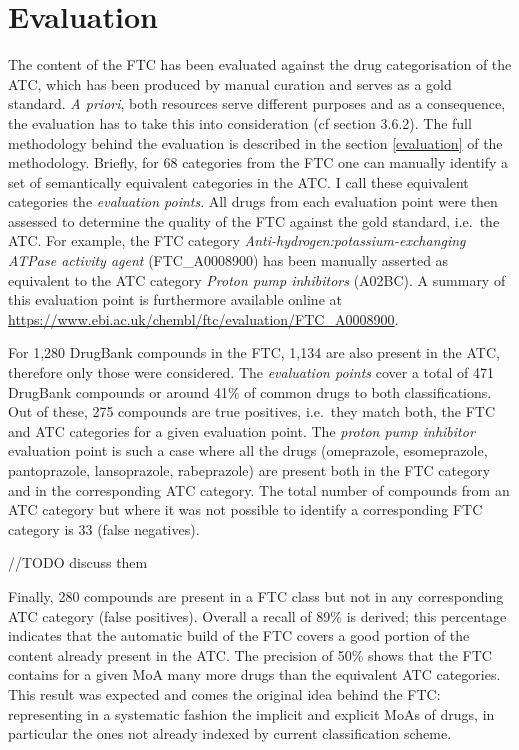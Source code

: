 \section{Evaluation}
The content of the FTC has been evaluated against the drug categorisation of the ATC, which has been produced by manual curation and serves as a gold standard. \emph{A priori}, both resources serve different purposes and as a consequence, the evaluation has to take this into consideration (cf section 3.6.2). The full methodology behind the evaluation is described in the section \ref{evaluation} of the methodology. Briefly, for 68 categories from the FTC one can manually identify a set of semantically equivalent categories in the ATC. I call these equivalent categories the \emph{evaluation points}. All drugs from each evaluation point were then assessed to determine the quality of the FTC against the gold standard, i.e.\ the ATC. For example, the FTC category \emph{Anti-hydrogen:potassium-exchanging ATPase activity agent} (FTC\_A0008900) has been manually asserted as equivalent to the ATC category \emph{Proton pump inhibitors} (A02BC). A summary of this evaluation point is furthermore available online at \url{https://www.ebi.ac.uk/chembl/ftc/evaluation/FTC\_A0008900}.

For 1,280 DrugBank compounds in the FTC, 1,134 are also present in the ATC, therefore only those were considered. The \emph{evaluation points} cover a total of 471 DrugBank compounds or around 41\% of common drugs to both classifications. Out of these, 275 compounds are true positives, i.e.\ they match both, the FTC and ATC categories for a given evaluation point. The \emph{proton pump inhibitor} evaluation point is such a case where all the drugs (omeprazole, esomeprazole, pantoprazole, lansoprazole, rabeprazole) are present both in the FTC category and in the corresponding ATC category. The total number of compounds from an ATC category but where it was not possible to identify a corresponding FTC category is 33 (false negatives).

//TODO discuss them

Finally, 280 compounds are present in a FTC class but not in any corresponding ATC category (false positives). Overall a recall of 89\% is derived; this percentage indicates that the automatic build of the FTC covers a good portion of the content already present in the ATC. The precision of 50\% shows that the FTC contains for a given MoA many more drugs than the equivalent ATC categories. This result was expected and comes the original idea behind the FTC: representing in a systematic fashion the implicit and explicit MoAs of drugs, in particular the ones not already indexed by current classification scheme.

